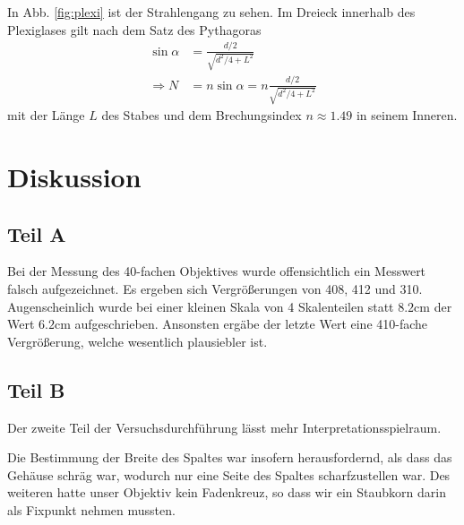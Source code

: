 \documentclass[12pt,a4paper,titlepage,headinclude,bibtotoc]{scrartcl}
\begin{document}
In Abb. \ref{fig:plexi} ist der Strahlengang zu sehen.
Im Dreieck innerhalb des Plexiglases gilt nach dem Satz des Pythagoras
\begin{align}
\sin\alpha&=\frac{d/2}{\sqrt{d^2/4+L^2}}\\
\Rightarrow N&=n\sin\alpha=n\frac{d/2}{\sqrt{d^2/4+L^2}}
\end{align}
mit der Länge $L$ des Stabes und dem Brechungsindex $n\approx1.49$ in seinem Inneren.

\section{Diskussion}
\label{sec:diskussion}
\subsection{Teil A}
Bei der Messung des 40-fachen Objektives wurde offensichtlich ein Messwert falsch aufgezeichnet.
Es ergeben sich Vergrößerungen von 408, 412 und 310.
Augenscheinlich wurde bei einer kleinen Skala von 4 Skalenteilen statt $8.2\si{\centi\metre}$ der Wert $6.2\si{\centi\metre}$ aufgeschrieben.
Ansonsten ergäbe der letzte Wert eine 410-fache Vergrößerung, welche wesentlich plausiebler ist.

\subsection{Teil B}
Der zweite Teil der Versuchsdurchführung lässt mehr Interpretationsspielraum.

Die Bestimmung der Breite des Spaltes war insofern herausfordernd, als dass das Gehäuse schräg war, wodurch nur eine Seite des Spaltes scharfzustellen war.
Des weiteren hatte unser Objektiv kein Fadenkreuz, so dass wir ein Staubkorn darin als Fixpunkt nehmen mussten.




\end{document}
